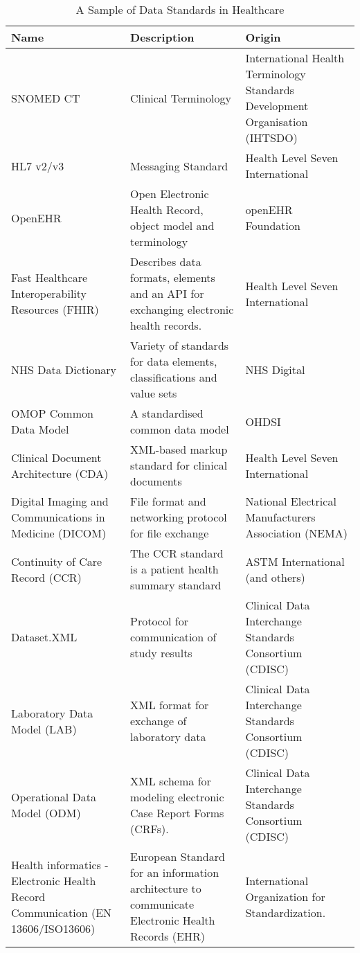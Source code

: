 \documentclass[runningheads]{llncs}
\begin{document}
	 \begin{table}[!htbp]
		\begin{center}
			\caption{A Sample of Data Standards in Healthcare}
			\label{tab:datastandards}
			\begin{tabular}{ p{3cm} | p{5cm} | p{4cm }  } 
				\textbf{Name} & \textbf{Description} & \textbf{Origin} \\
				\hline
				SNOMED CT & Clinical Terminology&  International Health Terminology Standards Development Organisation (IHTSDO)  \\ 
				\hline
				HL7 v2/v3  & Messaging Standard &  Health Level Seven International \\
				\hline
				OpenEHR  & Open Electronic Health Record, object model and terminology &   openEHR Foundation\\  
				\hline
				Fast Healthcare Interoperability Resources (FHIR) & Describes data formats, elements and an API for exchanging electronic health records.&  Health Level Seven International  \\ 
					\hline
				NHS Data Dictionary &  Variety of standards for data elements, classifications and value sets &  NHS Digital  \\
				\hline
				OMOP Common Data Model  &   A standardised common data model  &  OHDSI \\
				\hline
				Clinical Document Architecture (CDA)  &  XML-based markup standard for clinical documents&  Health Level Seven International   \\ 
				\hline
				Digital Imaging and Communications in Medicine (DICOM)  & File format and networking protocol for file exchange &   National Electrical Manufacturers Association (NEMA)  \\ 
					\hline
				Continuity of Care Record (CCR)  &  The CCR standard is a patient health summary standard &   ASTM International (and others) \\
					\hline
				Dataset.XML  &  Protocol for communication of study results  &   Clinical Data Interchange Standards Consortium (CDISC)  \\
					\hline
				Laboratory Data Model (LAB)  &  XML format for exchange of laboratory data &  Clinical Data Interchange Standards Consortium (CDISC)  \\
					\hline
				Operational Data Model (ODM) &  XML schema for modeling electronic Case Report Forms (CRFs).  &  Clinical Data Interchange Standards Consortium (CDISC)  \\
					\hline
				Health informatics - Electronic Health Record Communication (EN 13606/ISO13606)   &  European Standard for an information architecture to communicate Electronic Health Records (EHR) &  International Organization for Standardization.   \\

\end{tabular}
\end{center}
\end{table}
\end{document}
